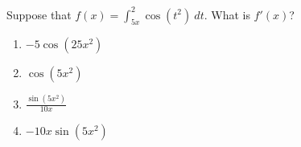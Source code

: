 \item Suppose that $f(x) = \displaystyle \int_{5x}^{2} \cos(t^2) \ dt$.  What is $f'(x)$?

\begin{multicols}{2}
	\begin{enumerate}\setlength{\itemsep}{.5 cm}
	\item $\displaystyle-5\cos (25x^2)$ %
	\item $\displaystyle\cos(5x^2)$
	\item $\displaystyle \frac{\sin (5x^2)}{10x}$
	\item $\displaystyle-10x\sin(5x^2)$
	\end{enumerate}
\end{multicols}
